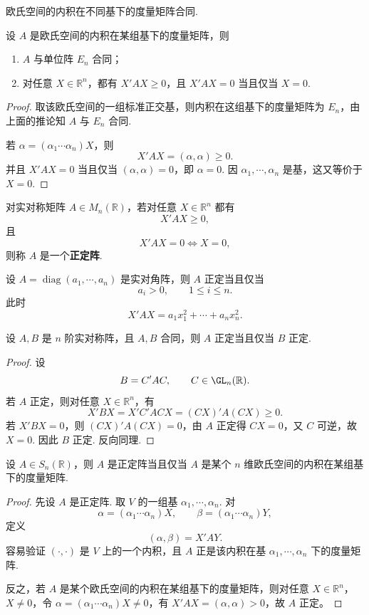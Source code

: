\begin{corollary}
	欧氏空间的内积在不同基下的度量矩阵合同.
\end{corollary}

\begin{example}
	设 $A$ 是欧氏空间的内积在某组基下的度量矩阵，则
	\begin{enumerate}
		\item $A$ 与单位阵 $E_n$ 合同；
		\item 对任意 $X\in\mathbb{R}^n$，都有 $X'AX\geqslant0$，且 $X'AX=0$ 当且仅当 $X=0$.
	\end{enumerate}
\end{example}
\begin{proof}
	取该欧氏空间的一组标准正交基，则内积在这组基下的度量矩阵为 $E_n$，由上面的推论知 $A$ 与 $E_n$ 合同.
	
	若 $\alpha=(\alpha_1\cdots\alpha_n)X$，则
	\[
	X'AX=(\alpha,\alpha)\geqslant0.
	\]
	并且 $X'AX=0$ 当且仅当 $(\alpha,\alpha)=0$，即 $\alpha=0$. 因 $\alpha_1,\cdots,\alpha_n$ 是基，这又等价于 $X=0$.
\end{proof}

\begin{definition}
	对实对称矩阵 $A\in M_n(\mathbb{R})$，若对任意 $X\in\mathbb{R}^n$ 都有
	\[
	X'AX\geqslant0,
	\]
	且
	\[
	X'AX=0\Longleftrightarrow X=0,
	\]
	则称 $A$ 是一个\textbf{正定阵}.
\end{definition}

\begin{example}
	设 $A=\operatorname{diag}(a_1,\cdots,a_n)$ 是实对角阵，则 $A$ 正定当且仅当
	\[
	a_i>0,
	\qquad 1\leqslant i\leqslant n.
	\]
	此时
	\[
	X'AX=a_1x_1^2+\cdots+a_nx_n^2.
	\]
\end{example}

\begin{example}
	设 $A,B$ 是 $n$ 阶实对称阵，且 $A,B$ 合同，则 $A$ 正定当且仅当 $B$ 正定.
\end{example}
\begin{proof}
	设
	\[
	B=C'AC,
	\qquad C\in \GL_n(\mathbb{R}).
	\]
	若 $A$ 正定，则对任意 $X\in\mathbb{R}^n$，有
	\[
	X'BX=X'C'ACX=(CX)'A(CX)\geqslant0.
	\]
	若 $X'BX=0$，则 $(CX)'A(CX)=0$，由 $A$ 正定得 $CX=0$，又 $C$ 可逆，故 $X=0$. 因此 $B$ 正定. 反向同理.
\end{proof}

\begin{proposition}
	设 $A\in S_n(\mathbb{R})$，则 $A$ 是正定阵当且仅当 $A$ 是某个 $n$ 维欧氏空间的内积在某组基下的度量矩阵.
\end{proposition}
\begin{proof}
	先设 $A$ 是正定阵. 取 $V$ 的一组基 $\alpha_1,\cdots,\alpha_n$. 对
	\[
	\alpha=(\alpha_1\cdots\alpha_n)X,
	\qquad
	\beta=(\alpha_1\cdots\alpha_n)Y,
	\]
	定义
	\[
	(\alpha,\beta)=X'AY.
	\]
	容易验证 $(\cdot,\cdot)$ 是 $V$ 上的一个内积，且 $A$ 正是该内积在基 $\alpha_1,\cdots,\alpha_n$ 下的度量矩阵.
	
	反之，若 $A$ 是某个欧氏空间的内积在某组基下的度量矩阵，则对任意 $X\in\mathbb{R}^n$，$X\neq0$，令 $\alpha=(\alpha_1\cdots\alpha_n)X\neq0$，有 $X'AX=(\alpha,\alpha)>0$，故 $A$ 正定。
\end{proof}

